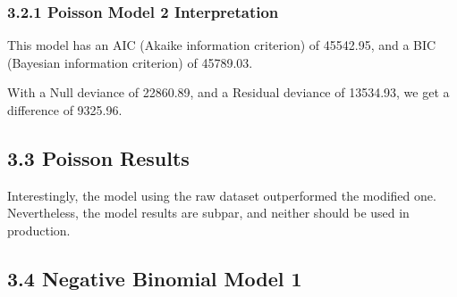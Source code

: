 \documentclass[]{article}
\begin{document}
\hypertarget{poisson-model-2-interpretation}{%
\subsubsection{3.2.1 Poisson Model 2
Interpretation}\label{poisson-model-2-interpretation}}

This model has an AIC (Akaike information criterion) of 45542.95, and a
BIC (Bayesian information criterion) of 45789.03.

With a Null deviance of 22860.89, and a Residual deviance of 13534.93,
we get a difference of 9325.96.

\hypertarget{poisson-results}{%
\subsection{3.3 Poisson Results}\label{poisson-results}}

Interestingly, the model using the raw dataset outperformed the modified
one. Nevertheless, the model results are subpar, and neither should be
used in production.

\hypertarget{negative-binomial-model-1}{%
\subsection{3.4 Negative Binomial Model
1}\label{negative-binomial-model-1}}
\end{document}
